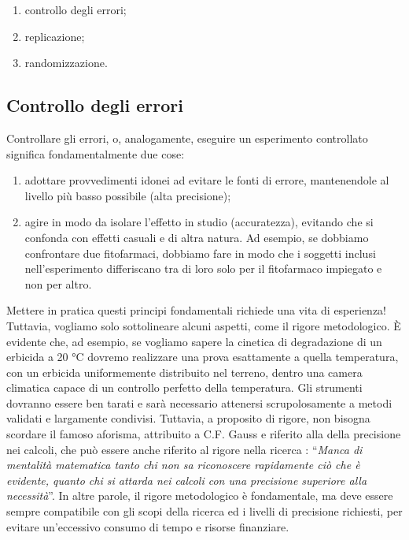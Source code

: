 \documentclass[a4paper,12pt,oneside]{book}
\providecommand{\tightlist}{%
  \setlength{\itemsep}{0pt}\setlength{\parskip}{0pt}}
\begin{document}
\begin{enumerate}
\def\labelenumi{\arabic{enumi}.}
\tightlist
\item
  controllo degli errori;
\item
  replicazione;
\item
  randomizzazione.
\end{enumerate}

\hypertarget{controllo-degli-errori}{%
\subsection{Controllo degli errori}\label{controllo-degli-errori}}

Controllare gli errori, o, analogamente, eseguire un esperimento controllato significa fondamentalmente due cose:

\begin{enumerate}
\def\labelenumi{\arabic{enumi}.}
\tightlist
\item
  adottare provvedimenti idonei ad evitare le fonti di errore, mantenendole al livello più basso possibile (alta precisione);
\item
  agire in modo da isolare l'effetto in studio (accuratezza), evitando che si confonda con effetti casuali e di altra natura. Ad esempio, se dobbiamo confrontare due fitofarmaci, dobbiamo fare in modo che i soggetti inclusi nell'esperimento differiscano tra di loro solo per il fitofarmaco impiegato e non per altro.
\end{enumerate}

Mettere in pratica questi principi fondamentali richiede una vita di esperienza! Tuttavia, vogliamo solo sottolineare alcuni aspetti, come il rigore metodologico. È evidente che, ad esempio, se vogliamo sapere la cinetica di degradazione di un erbicida a 20 °C dovremo realizzare una prova esattamente a quella temperatura, con un erbicida uniformemente distribuito nel terreno, dentro una camera climatica capace di un controllo perfetto della temperatura. Gli strumenti dovranno essere ben tarati e sarà necessario attenersi scrupolosamente a metodi validati e largamente condivisi. Tuttavia, a proposito di rigore, non bisogna scordare il famoso aforisma, attribuito a C.F. Gauss e riferito alla della precisione nei calcoli, che può essere anche riferito al rigore nella ricerca : ``\emph{Manca di mentalità matematica tanto chi non sa riconoscere rapidamente ciò che è evidente, quanto chi si attarda nei calcoli con una precisione superiore alla necessità}''. In altre parole, il rigore metodologico è fondamentale, ma deve essere sempre compatibile con gli scopi della ricerca ed i livelli di precisione richiesti, per evitare un'eccessivo consumo di tempo e risorse finanziare.
\end{document}
